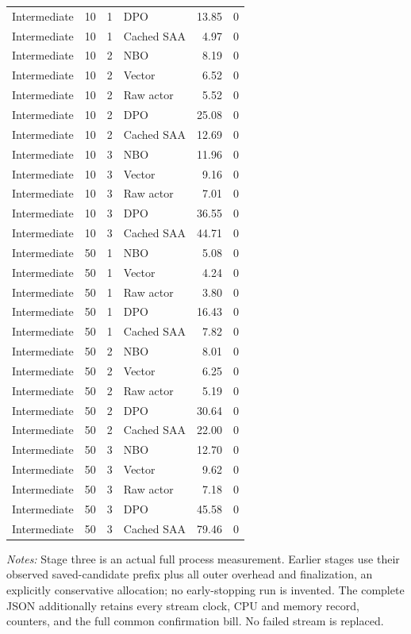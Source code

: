 \begin{longtable}{llrlrr}
Intermediate & 10 & 1 & DPO & 13.85 & 0 \\
Intermediate & 10 & 1 & Cached SAA & 4.97 & 0 \\
Intermediate & 10 & 2 & NBO & 8.19 & 0 \\
Intermediate & 10 & 2 & Vector & 6.52 & 0 \\
Intermediate & 10 & 2 & Raw actor & 5.52 & 0 \\
Intermediate & 10 & 2 & DPO & 25.08 & 0 \\
Intermediate & 10 & 2 & Cached SAA & 12.69 & 0 \\
Intermediate & 10 & 3 & NBO & 11.96 & 0 \\
Intermediate & 10 & 3 & Vector & 9.16 & 0 \\
Intermediate & 10 & 3 & Raw actor & 7.01 & 0 \\
Intermediate & 10 & 3 & DPO & 36.55 & 0 \\
Intermediate & 10 & 3 & Cached SAA & 44.71 & 0 \\
Intermediate & 50 & 1 & NBO & 5.08 & 0 \\
Intermediate & 50 & 1 & Vector & 4.24 & 0 \\
Intermediate & 50 & 1 & Raw actor & 3.80 & 0 \\
Intermediate & 50 & 1 & DPO & 16.43 & 0 \\
Intermediate & 50 & 1 & Cached SAA & 7.82 & 0 \\
Intermediate & 50 & 2 & NBO & 8.01 & 0 \\
Intermediate & 50 & 2 & Vector & 6.25 & 0 \\
Intermediate & 50 & 2 & Raw actor & 5.19 & 0 \\
Intermediate & 50 & 2 & DPO & 30.64 & 0 \\
Intermediate & 50 & 2 & Cached SAA & 22.00 & 0 \\
Intermediate & 50 & 3 & NBO & 12.70 & 0 \\
Intermediate & 50 & 3 & Vector & 9.62 & 0 \\
Intermediate & 50 & 3 & Raw actor & 7.18 & 0 \\
Intermediate & 50 & 3 & DPO & 45.58 & 0 \\
Intermediate & 50 & 3 & Cached SAA & 79.46 & 0 \\
\bottomrule
\end{longtable}
\begin{minipage}{0.97\linewidth}\footnotesize\emph{Notes:} Stage three is an actual full process measurement. Earlier stages use their observed saved-candidate prefix plus all outer overhead and finalization, an explicitly conservative allocation; no early-stopping run is invented. The complete JSON additionally retains every stream clock, CPU and memory record, counters, and the full common confirmation bill. No failed stream is replaced.
\end{minipage}
